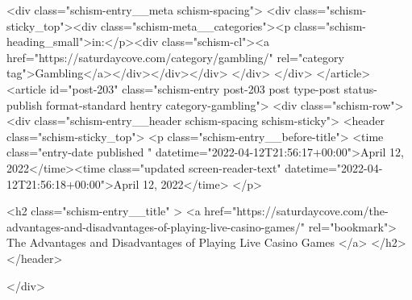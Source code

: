 {		<div class="schism-entry__meta schism-spacing">			<div class="schism-sticky_top"><div class="schism-meta__categories"><p class="schism-heading_small">in:</p><div class="schism-cl"><a href="https://saturdaycove.com/category/gambling/" rel="category tag">Gambling</a></div></div></div>		</div>
	</div>
</article>
<article id="post-203" class="schism-entry post-203 post type-post status-publish format-standard hentry category-gambling">
	<div class="schism-row">		<div class="schism-entry__header schism-spacing schism-sticky">			<header class="schism-sticky_top">				<p class="schism-entry__before-title">
					<time class="entry-date published " datetime="2022-04-12T21:56:17+00:00">April 12, 2022</time><time class="updated screen-reader-text" datetime="2022-04-12T21:56:18+00:00">April 12, 2022</time>				</p>

				<h2 class="schism-entry__title" >
					<a href="https://saturdaycove.com/the-advantages-and-disadvantages-of-playing-live-casino-games/" rel="bookmark">
						The Advantages and Disadvantages of Playing Live Casino Games					</a>
				</h2>
			</header>

					</div>

}
